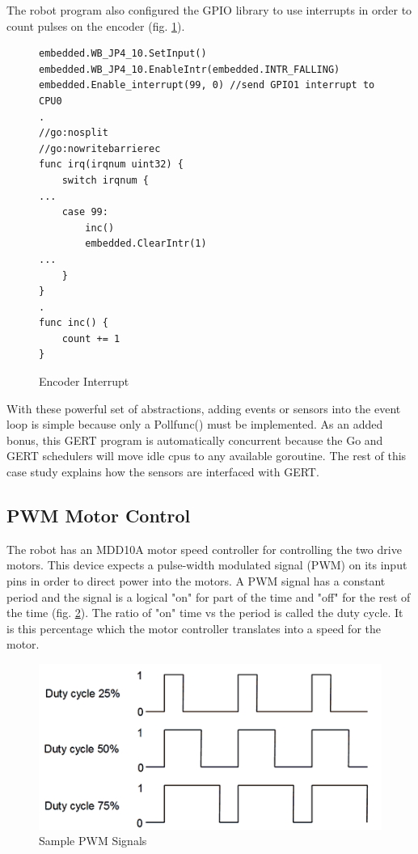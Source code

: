 The robot program also configured the GPIO library to use interrupts in order to count pulses on the encoder (fig. \ref{fig:encoder}).

\begin{figure}[!h]
\begin{center}
\begin{lstlisting}
embedded.WB_JP4_10.SetInput()
embedded.WB_JP4_10.EnableIntr(embedded.INTR_FALLING)
embedded.Enable_interrupt(99, 0) //send GPIO1 interrupt to CPU0
.
//go:nosplit
//go:nowritebarrierec
func irq(irqnum uint32) {
	switch irqnum {
...
	case 99:
		inc()
		embedded.ClearIntr(1)
...
	}
}
.
func inc() {
	count += 1
}

\end{lstlisting}
\end{center}
  \caption{Encoder Interrupt} \label{fig:encoder}
\end{figure}

With these powerful set of abstractions, adding events or sensors into the event loop
is simple because only a Pollfunc() must be implemented. As an added bonus, this
GERT program is automatically concurrent because the Go and GERT schedulers will
move idle cpus to any available goroutine. The rest of this case study explains how the sensors
are interfaced with GERT.


\subsection{PWM Motor Control}
The robot has an MDD10A motor speed controller for controlling the two drive motors. This device
expects a pulse-width modulated signal (PWM) on its input pins in order to direct power into the
motors. A PWM signal has a constant period and the signal is a logical "on" for part of the time
and "off" for the rest of the time (fig. \ref{fig:pwm}). The ratio of "on" time vs the period is called the duty cycle.
It is this percentage which the motor controller translates into a speed for the motor.

\begin{figure}[h]
\begin{center}
  \includegraphics[scale=0.5]{pwm}
\end{center}
  \caption{Sample PWM Signals} \label{fig:pwm}
\end{figure}


